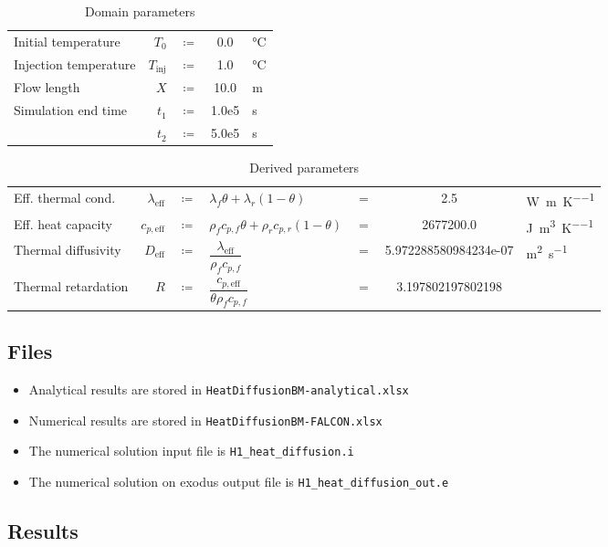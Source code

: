 \begin{table}[h]
	\caption{Domain parameters}
	\begin{center}
	\begin{tabular}{lrcSs}
		Initial temperature & $T_0$ & $\coloneqq$ & 0.0 & \si{\degreeCelsius} \\
		Injection temperature & $T_{\text{inj}}$ & $\coloneqq$ & 1.0 & \si{\degreeCelsius} \\
		Flow length & $X$ & $\coloneqq$ & 10.0 & \si{\metre} \\
		Simulation end time& $t_1$ & $\coloneqq$ & 1.0e5  & \si{\second} \\
		& $t_2$ & $\coloneqq$ & 5.0e5  & \si{\second} 
	\end{tabular}
	\end{center}
	\label{tab:heatDiffDomPar}
\end{table}

\setlength{\tabcolsep}{3pt}
\begin{table}[h]
	\caption{Derived parameters}
	\begin{center}
		\begin{tabular}{lrclcSs}
			Eff. thermal cond. & $\lambda_{\text{eff}}$ & $\coloneqq$ & $\lambda_f\theta+\lambda_r(1-\theta)$ & $=$ &2.5 & \si{\watt\per\metre\per\kelvin} \\
 		Eff. heat capacity & $c_{p,\text{eff}}$ & $\coloneqq$ & $\rho_fc_{p,f}\theta+\rho_r c_{p,r}(1-\theta)$ & $=$ & 2677200.0 & \si{\joule\per\metre\cubed\per\kelvin} \\
		Thermal diffusivity & $D_{\text{eff}}$ & $\coloneqq$ & $\dfrac{\lambda_{\text{eff}}}{\rho_fc_{p,f}} $ & $=$ & 5.972288580984234e-07 & \si{\metre\squared\per\second} \\
		Thermal retardation & $R$ & $\coloneqq$ & $\dfrac{c_{p,\text{eff}}}{\theta\rho_fc_{p,f}}$ & $=$ & 3.197802197802198 & \\
	\end{tabular}
	\end{center}
	\label{tab:heatDiffDerivPar}
\end{table}

\subsection{Files}
\begin{itemize}
	\item Analytical results are stored in \verb|HeatDiffusionBM-analytical.xlsx|
	\item Numerical results are stored in \verb|HeatDiffusionBM-FALCON.xlsx|
	\item The numerical solution input file is \verb|H1_heat_diffusion.i|
	\item The numerical solution on exodus output file is \verb|H1_heat_diffusion_out.e|
\end{itemize}

\subsection{Results}
\begin{figure}[h!]
	\begin{center}
		\setlength\figureheight{8cm} 
		\setlength{} 
		
	\end{center}
	\label{fig:heatDiff}
\end{figure}